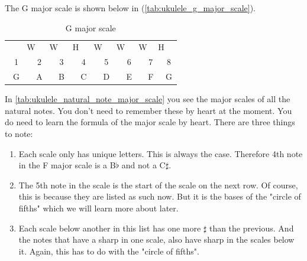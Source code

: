 The G major scale is shown below in (\autoref{tab:ukulele_g_major_scale}).

\begin{table}[h]
	\centering
	\begin{tabular}{*{16}{c}}
		& \multicolumn{2}{P{4mm}}{\large{W}} & \multicolumn{2}{P{4mm}}{\large{W}} & \multicolumn{2}{P{4mm}}{\large{H}} & \multicolumn{2}{P{4mm}}{\large{W}} & \multicolumn{2}{P{4mm}}{\large{W}} & \multicolumn{2}{P{4mm}}{\large{W}} & \multicolumn{2}{P{4mm}}{\large{H}} & \\
		\multicolumn{2}{P{4mm}}{1} & \multicolumn{2}{P{4mm}}{2} & \multicolumn{2}{P{4mm}}{3} & \multicolumn{2}{P{4mm}}{4} & \multicolumn{2}{P{4mm}}{5} & \multicolumn{2}{P{4mm}}{6} & \multicolumn{2}{P{4mm}}{7} & \multicolumn{2}{P{4mm}}{8} \\
		\multicolumn{2}{P{4mm}}{G} & \multicolumn{2}{P{4mm}}{A} & \multicolumn{2}{P{4mm}}{B} & \multicolumn{2}{P{4mm}}{C} & \multicolumn{2}{P{4mm}}{D} & \multicolumn{2}{P{4mm}}{E} & \multicolumn{2}{P{4mm}}{F\sharp} & \multicolumn{2}{P{4mm}}{G}
	\end{tabular}
	\caption{G major scale}
	\label{tab:ukulele_g_major_scale}
\end{table}

In \autoref{tab:ukulele_natural_note_major_scale} you see the major scales of all the natural notes. You don't need to remember these by heart at the moment. You do need to learn the formula of the major scale by heart. There are three things to note:

\begin{enumerate}
	\item Each scale only has unique letters. This is always the case. Therefore 4th note in the F major scale is a B$\flat$ and not a C$\sharp$.
	\item The 5th note in the scale is the start of the scale on the next row. Of course, this is because they are listed as such now. But it is the bases of the "circle of fifths" which we will learn more about later.
	\item Each scale below another in this list has one more $\sharp$ than the previous. And the notes that have a sharp in one scale, also have sharp in the scales below it. Again, this has to do with the "circle of fifths".
\end{enumerate}

